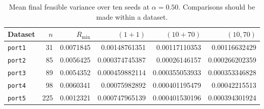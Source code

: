 \begin{table}[htbp]
\centering
\small
\caption{Mean final feasible variance over ten seeds at $\alpha=0.50$. Comparisons should be made within a dataset.}
\label{tab:es-mid-target}
\begin{tabular}{lrrrrr}
\toprule
Dataset & $n$ & $R_{\min}$ & $(1+1)$ & $(10+70)$ & $(10,70)$\\
\midrule
\texttt{port1} & 31 & 0.0071845 & \num{0.00148761351} & \num{0.00117110353} & \num{0.00116632429}\\
\texttt{port2} & 85 & 0.0056425 & \num{0.000374745387} & \num{0.00026146157} & \num{0.000266202359}\\
\texttt{port3} & 89 & 0.0054352 & \num{0.000459882114} & \num{0.000355053933} & \num{0.000353346828}\\
\texttt{port4} & 98 & 0.0060341 & \num{0.00075982892} & \num{0.000401195479} & \num{0.00042215513}\\
\texttt{port5} & 225 & 0.0012321 & \num{0.000747965139} & \num{0.000401530196} & \num{0.000394301924}\\
\bottomrule
\end{tabular}
\end{table}
